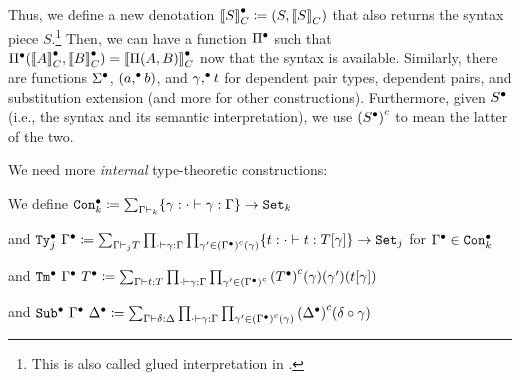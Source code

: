 Thus, we define a new denotation ${\llbracket {S} \rrbracket}_C^\bullet \coloneq (S, {\llbracket {S} \rrbracket}_C)$
that also returns the syntax piece $S$.\footnote{This is also called
glued interpretation in \citet{sterling2019algebraic}.}
Then, we can have a
function ${\Pi}^\bullet$ such that $\Pi^\bullet({{\llbracket {A} \rrbracket}_C^\bullet},{{\llbracket {B} \rrbracket}_C^\bullet}) =
{\llbracket {\ensuremath{\Pi({A},{B})}} \rrbracket}_C^\bullet$ now that the syntax is available.
Similarly, there are functions ${\Sigma}^\bullet$, $({a},^\bullet{b})$, and
${\gamma},^\bullet{t}$ for dependent pair types, dependent pairs, and
substitution extension (and more for other constructions).
Furthermore, given ${S}^\bullet$ (i.e., the syntax and its semantic interpretation),
we use ${({{S}^\bullet})}^c$ to mean the latter of the two.%

\newcommand{\GTy}[2]{\ensuremath{\Glued{\texttt{Ty}}_{#1}~{#2}}}
\newcommand{\GCon}[1]{\ensuremath{\Glued{\texttt{Con}}_{#1}}}
\newcommand{\GTm}[2]{\ensuremath{\Glued{\texttt{Tm}}~{#1}~{#2}}}
\newcommand{\GSub}[2]{\ensuremath{\Glued{\texttt{Sub}}~{#1}~{#2}}}
\newcommand{\GMWSig}[3]{\ensuremath{{\texttt{WSig}^C}_{#1}^{#3}~{#2}}}
\newcommand{\GWSig}[3]{\ensuremath{{\Glued{\texttt{WSig}}}_{#1}^{#3}~{#2}}}


We need more \emph{internal} type-theoretic constructions:

We define $\GCon{k} \coloneq \sum_{\goodCtx{\Gm}{k}} \{\gm : \goodSub{\cdot}{\gm}{\Gm} \} \to \Set{k}$ 


and $\GTy{j}{\Glued{\Gm}} \coloneq \sum_{\goodType{\Gm}{T}{j}} \prod_{\goodSub{\cdot}{\gm}{\Gm}}\prod_{\gm' \in \Gmodel{\Glued{\Gm}}(\gm)}\{t : \goodTerm{\cdot}{t}{\sub{T}{\gm}}\}\to\Set{j} $ for $\Glued{\Gm} \in \GCon{k}$

and $\GTm{\Glued{\Gm}}{\Glued{T}} \coloneq \sum_{\goodTerm{\Gm}{t}{T}} \prod_{\goodSub{\cdot}{\gm}{\Gm}} \prod_{\gm' \in\Gmodel{\Glued{\Gm}}} \Gmodel{\Glued{T}}(\gm)(\gm')(\sub{t}{\gm})$

and $\GSub{\Glued{\Gm}}{\Glued{\Dl}} \coloneq \sum_{\goodSub{\Gm}{\delta}{\Dl}} \prod_{\goodSub{\cdot}{\gm}{\Gm}} \prod_{\gm' \in \Gmodel{\Glued{\Gm}}(\gm)} \Gmodel{\Glued{\Dl}}(\delta \circ \gm) $

